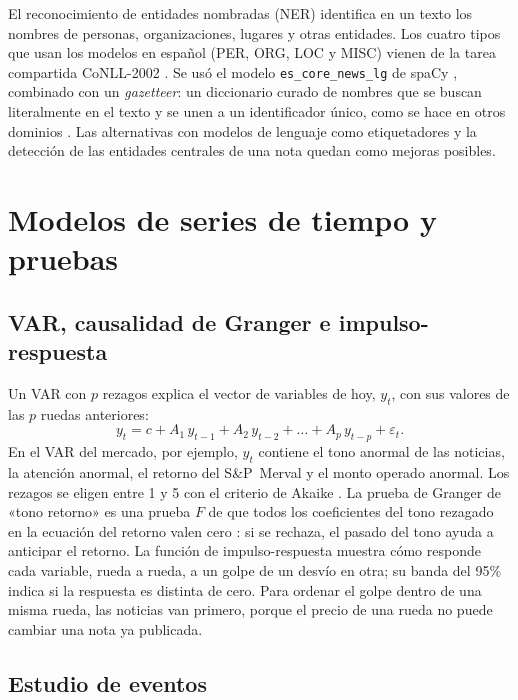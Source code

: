 El reconocimiento de entidades nombradas (NER) identifica en un texto los nombres de
personas, organizaciones, lugares y otras entidades. Los cuatro tipos que usan los modelos en
español (PER, ORG, LOC y MISC) vienen de la tarea compartida CoNLL-2002
\citep{tjongkimsang2002conll}. Se usó el modelo \texttt{es\_core\_news\_lg} de spaCy
\citep{honnibal2020spacy}, combinado con un \textit{gazetteer}: un diccionario curado de
nombres que se buscan literalmente en el texto y se unen a un identificador único, como se
hace en otros dominios \citep{ujiie2021dict}. Las alternativas con modelos de lenguaje como
etiquetadores \citep{golde2025finerweb} y la detección de las entidades centrales de una nota
\citep{asgarieh2024salient} quedan como mejoras posibles.

\section{Modelos de series de tiempo y pruebas}
\label{sec:tec-modelos}

\subsection{VAR, causalidad de Granger e impulso-respuesta}

Un VAR con $p$ rezagos explica el vector de variables de hoy, $y_t$, con sus valores de las
$p$ ruedas anteriores:
\begin{equation}
y_t = c + A_1\, y_{t-1} + A_2\, y_{t-2} + \dots + A_p\, y_{t-p} + \varepsilon_t .
\end{equation}
En el VAR del mercado, por ejemplo, $y_t$ contiene el tono anormal de las noticias, la
atención anormal, el retorno del S\&P~Merval y el monto operado anormal. Los rezagos se eligen
entre 1 y 5 con el criterio de Akaike \citep{lutkepohl2005}. La prueba de Granger de
«tono \flecha{} retorno» es una prueba $F$ de que todos los coeficientes del tono rezagado en
la ecuación del retorno valen cero \citep{granger1969}: si se rechaza, el pasado del tono ayuda
a anticipar el retorno. La función de impulso-respuesta muestra cómo responde cada variable,
rueda a rueda, a un golpe de un desvío en otra; su banda del 95\% indica si la respuesta es
distinta de cero. Para ordenar el golpe dentro de una misma rueda, las noticias van primero,
porque el precio de una rueda no puede cambiar una nota ya publicada.

\subsection{Estudio de eventos}

